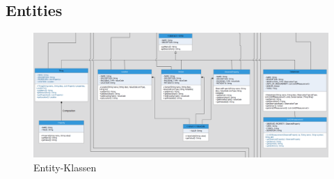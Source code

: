 
\clearpage

\clearpage

\clearpage


\clearpage
\subsection{Entities}
\begin{figure}[!h]
\centering
\includegraphics[scale=0.36]{uml/screenshots/entity}
\caption{Entity-Klassen}
\end{figure}


\clearpage

\clearpage

\clearpage

\clearpage

\clearpage

\clearpage

\clearpage


\clearpage
